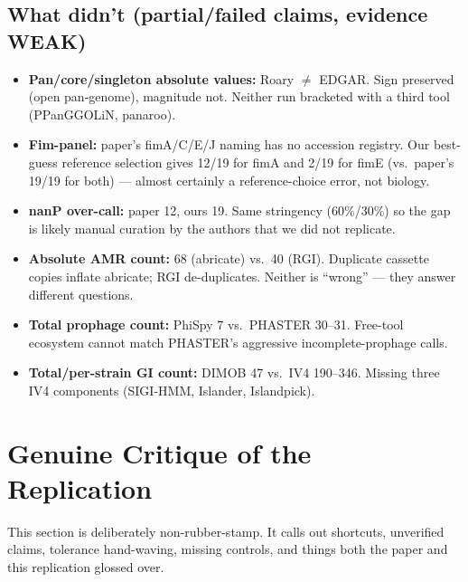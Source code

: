 \documentclass[11pt,a4paper]{article}
\begin{document}
\subsection{What didn't (partial/failed claims, evidence WEAK)}
\begin{itemize}
\item \textbf{Pan/core/singleton absolute values:} Roary $\neq$ EDGAR. Sign preserved (open pan-genome), magnitude not. Neither run bracketed with a third tool (PPanGGOLiN, panaroo).
\item \textbf{Fim-panel:} paper's fimA/C/E/J naming has no accession registry. Our best-guess reference selection gives 12/19 for fimA and 2/19 for fimE (vs.\ paper's 19/19 for both) --- almost certainly a reference-choice error, not biology.
\item \textbf{nanP over-call:} paper 12, ours 19. Same stringency (60\%/30\%) so the gap is likely manual curation by the authors that we did not replicate.
\item \textbf{Absolute AMR count:} 68 (abricate) vs.\ 40 (RGI). Duplicate cassette copies inflate abricate; RGI de-duplicates. Neither is ``wrong'' --- they answer different questions.
\item \textbf{Total prophage count:} PhiSpy 7 vs.\ PHASTER 30--31. Free-tool ecosystem cannot match PHASTER's aggressive incomplete-prophage calls.
\item \textbf{Total/per-strain GI count:} DIMOB 47 vs.\ IV4 190--346. Missing three IV4 components (SIGI-HMM, Islander, Islandpick).
\end{itemize}

\section{Genuine Critique of the Replication}\label{sec:critique}

This section is deliberately non-rubber-stamp. It calls out shortcuts, unverified claims, tolerance hand-waving, missing controls, and things both the paper and this replication glossed over.
\end{document}
